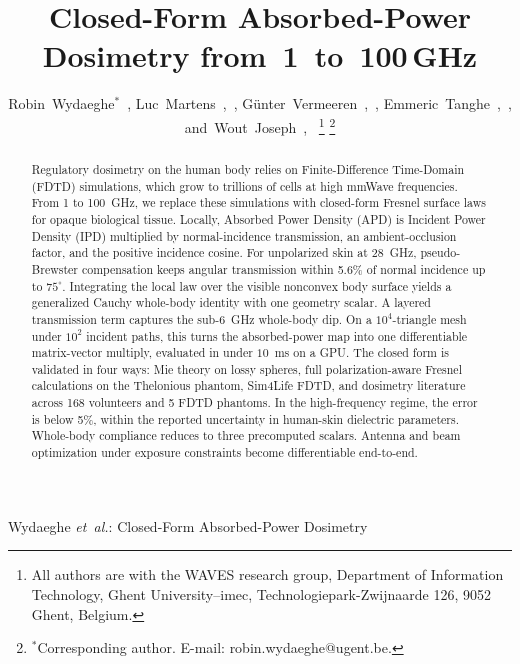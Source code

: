\documentclass[journal,twocolumn,10pt]{IEEEtran}
\theoremstyle{plain}
\begin{document}
\title{Closed-Form Absorbed-Power Dosimetry from~1~to~100\,GHz}

\author{Robin~Wydaeghe$^{*}$~,
  Luc~Martens~,~,
  G\"unter~Vermeeren~,~,
  Emmeric~Tanghe~,~,
  and~Wout~Joseph~,~%
  \thanks{All authors are with the WAVES research group, Department of
  Information Technology, Ghent University--imec, Technologiepark-Zwijnaarde
  126, 9052 Ghent, Belgium.}%
  \thanks{$^{*}$Corresponding author. E-mail: robin.wydaeghe@ugent.be.}}

%
{Wydaeghe \MakeLowercase{\textit{et~al.}}: Closed-Form
Absorbed-Power Dosimetry}

\maketitle

\begin{abstract}
Regulatory dosimetry on the human body relies on Finite-Difference
Time-Domain (FDTD) simulations, which grow to trillions of cells at
high mmWave frequencies. From 1 to 100~GHz, we replace these
simulations with closed-form Fresnel surface laws for opaque
biological tissue. Locally, Absorbed Power Density (APD) is Incident
Power Density (IPD) multiplied by normal-incidence transmission, an
ambient-occlusion factor, and the positive incidence cosine. For
unpolarized skin at 28~GHz, pseudo-Brewster compensation keeps
angular transmission within 5.6\% of normal incidence up to
$75^\circ$. Integrating the local law over the visible nonconvex body
surface yields a generalized Cauchy whole-body identity with one
geometry scalar. A layered transmission term captures the sub-6~GHz
whole-body dip. On a $10^4$-triangle mesh under $10^2$ incident
paths, this turns the absorbed-power map into one differentiable
matrix-vector multiply, evaluated in under $10$~ms on a GPU. The
closed form is validated in four ways: Mie theory on lossy spheres,
full polarization-aware Fresnel calculations on the Thelonious
phantom, Sim4Life FDTD, and dosimetry literature across 168
volunteers and 5 FDTD phantoms. In the high-frequency regime, the
error is below 5\%, within the reported uncertainty in human-skin
dielectric parameters. Whole-body compliance reduces to three
precomputed scalars. Antenna and beam optimization under exposure
constraints become differentiable end-to-end.
\end{abstract}
\end{document}
